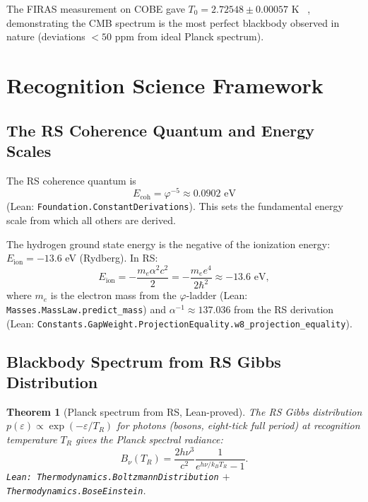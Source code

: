 \documentclass[12pt,a4paper]{article}
\newtheorem{theorem}{Theorem}[section]
\theoremstyle{definition}
\theoremstyle{remark}
\begin{document}
The FIRAS measurement on COBE gave $T_0 = 2.72548 \pm 0.00057$ K
~\cite{Fixsen1996,Fixsen2009}, demonstrating the CMB spectrum is
the most perfect blackbody observed in nature (deviations $< 50$
ppm from ideal Planck spectrum).

\section{Recognition Science Framework}
\label{sec:rs}

\subsection{The RS Coherence Quantum and Energy Scales}

The RS coherence quantum is
\begin{equation}
  E_\mathrm{coh} = \varphi^{-5} \approx 0.0902 \text{ eV}
  \label{eq:Ecoh}
\end{equation}
(Lean: \texttt{Foundation.ConstantDerivations}).  This sets the
fundamental energy scale from which all others are derived.

The hydrogen ground state energy is the negative of the ionization
energy: $E_\mathrm{ion} = -13.6$ eV (Rydberg).  In RS:
\begin{equation}
  E_\mathrm{ion} = -\frac{m_e\alpha^2 c^2}{2}
  = -\frac{m_e e^4}{2\hbar^2} \approx -13.6 \text{ eV},
\end{equation}
where $m_e$ is the electron mass from the $\varphi$-ladder
(Lean: \texttt{Masses.MassLaw.predict\_mass}) and $\alpha^{-1} \approx
137.036$ from the RS derivation
(Lean: \texttt{Constants.GapWeight.ProjectionEquality.w8\_projection\_equality}).

\subsection{Blackbody Spectrum from RS Gibbs Distribution}

\begin{theorem}[Planck spectrum from RS, Lean-proved]\label{thm:planck}
The RS Gibbs distribution $p(\varepsilon) \propto \exp(-\varepsilon/T_R)$
for photons (bosons, eight-tick full period) at recognition temperature
$T_R$ gives the Planck spectral radiance:
\begin{equation}
  B_\nu(T_R) = \frac{2h\nu^3}{c^2} \frac{1}{e^{h\nu/k_B T_R} - 1}.
\end{equation}
\texttt{Lean: Thermodynamics.BoltzmannDistribution} $+$
\texttt{Thermodynamics.BoseEinstein}.
\end{theorem}
\end{document}
